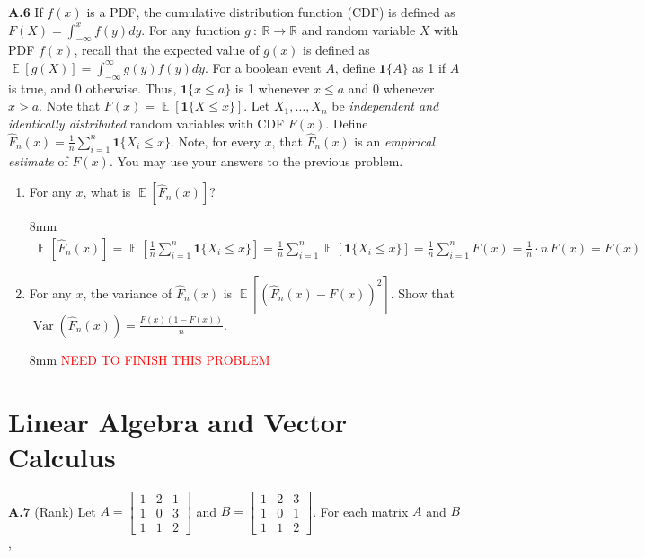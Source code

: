 \documentclass{article}
\newcommand{\note}[1]{\textsf{\textcolor{Red}{#1}}}
\newcommand{\vect}[1]{\boldsymbol{#1}} %
\DeclareMathOperator{\E}{\mathbb{E}}
\DeclareMathOperator{\var}{Var}
\newenvironment{solution}{\begin{adjustwidth}{8mm}{}}{\end{adjustwidth}}
\begin{document}
\textbf{A.6}
If $f(x)$ is a PDF, the cumulative distribution function (CDF) is defined as $F(X)=\int_{-\infty}^x f(y)dy$.
For any function $g ~:~ \mathbb{R} \to \mathbb{R}$ and random variable $X$ with PDF $f(x)$, recall that the expected value of $g(x)$ is defined as $\E[g(X)] = \int_{-\infty}^{\infty} g(y)f(y) dy$.
For a boolean event $A$, define $\vect{1}\{A\}$ as 1 if $A$ is true, and 0 otherwise.
Thus, $\vect{1}\{x \leq a\}$ is 1 whenever $x \leq a$ and 0 whenever $x > a$.
Note that $F(x) = \E[\vect{1}\{X \leq x\}]$.
Let $X_1, \dots, X_n$ be \textit{independent and identically distributed} random variables with CDF $F(x)$.
Define $\hat{F}_n(x) = \frac{1}{n} \sum_{i=1}^n \vect{1}\{X_i \leq x\}$.
Note, for every $x$, that $\hat{F}_n(x)$ is an \textit{empirical estimate} of $F(x)$.
You may use your answers to the previous problem.

\begin{enumerate}
        \item For any $x$, what is $\E[\hat{F}_n(x)]$?
        \begin{solution}
                \vspace{-5mm}
                \begin{align*}
                        \E[\hat{F}_n(x)] 
                        = \E[\frac{1}{n} \sum_{i=1}^n \vect{1}\{X_i \leq x\}]
                        = \frac{1}{n} \sum_{i=1}^n \E[\vect{1}\{X_i \leq x\}]
                        = \frac{1}{n} \sum_{i=1}^n F(x)
                        = \frac{1}{n} \cdot n \, F(x)
                        = F(x)                        
                \end{align*}
        \end{solution}
        \item For any $x$, the variance of $\hat{F}_n(x)$ is $\E[(\hat{F}_n(x) - F(x))^2]$.
                Show that $\var(\hat{F}_n(x)) = \frac{F(x)(1-F(x))}{n}$.
        \begin{solution}
                \note{NEED TO FINISH THIS PROBLEM}
        \end{solution}
\end{enumerate}


\section*{Linear Algebra and Vector Calculus}

\textbf{A.7}
(Rank)
Let $A = \begin{bmatrix} 
                1 & 2 & 1 \\
                1 & 0 & 3 \\ 
                1 & 1 & 2 
        \end{bmatrix}$ 
        and 
        $B = \begin{bmatrix} 
                1 & 2 & 3 \\ 
                1 & 0 & 1 \\ 
                1 & 1 & 2 
        \end{bmatrix}$.
For each matrix $A$ and $B$,
\end{document}
